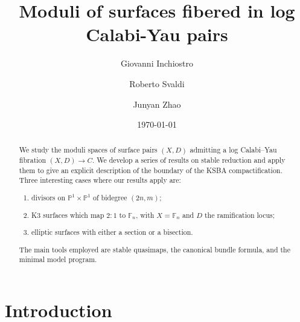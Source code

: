 \documentclass[a4paper,12pt]{amsart}
\title{Moduli of surfaces fibered in log Calabi-Yau pairs}
\date{\today}
\author{Giovanni Inchiostro}
\author{Roberto Svaldi}
\author{Junyan Zhao}
\newcommand{\bF}{\mathbb{F}}
\newcommand{\bP}{{\mathbb P}}
\theoremstyle{definition}
\theoremstyle{remark}
\begin{document}
\begin{abstract}
We study the moduli spaces of surface pairs $(X,D)$ admitting a log Calabi--Yau fibration \((X,D) \rightarrow C.\) We develop a series of results on stable reduction and apply them to give an explicit description of the boundary of the KSBA compactification. Three interesting cases where our results apply are:
\begin{enumerate}
    \item divisors on \(\mathbb{P}^1 \times \mathbb{P}^1\) of bidegree \((2n,m)\); 
    \item K3 surfaces which map $2:1$ to $\bF_n$, with $X=\bF_n$ and $D$ the ramification locus;
    \item elliptic surfaces with either a section or a bisection.
\end{enumerate}
The main tools employed are stable quasimaps, the canonical bundle formula, and the minimal model program.
\end{abstract}



\maketitle



\tableofcontents

\section{Introduction}

\end{document}
